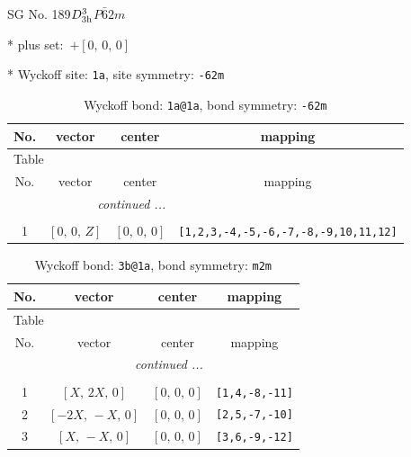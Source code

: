 \documentclass[fleqn,8pt]{jsarticle}
\begin{document}
\setcounter{MaxMatrixCols}{32}

\renewcommand{\tablename}{Table~}
\renewcommand{\figurename}{Figure~}
\begin{center}
\LARGE
SG No. 189\quad$D_{\rm 3h}^{3}$\quad$P\bar{6}2m$\quad[ hexagonal ]
\end{center}

* plus set:\,\,\,$+\left[ 0,\, 0,\, 0 \right]$


* Wyckoff site: {\tt 1a}, site symmetry: {\tt -62m}
\renewcommand{\arraystretch}{1.2}
\begin{longtable}{cccc}
\caption{Wyckoff bond: {\tt 1a@1a}, bond symmetry: {\tt -62m}}
 \\
 \hline \hline
No. & vector & center & mapping \\ \hline \endfirsthead

\multicolumn{3}{l}{\tablename\ \thetable{}} \\
 \hline \hline
No. & vector & center & mapping \\ \hline \endhead

 \hline \hline
\multicolumn{3}{r}{\footnotesize\it continued ...} \\ \endfoot

 \hline \hline
\multicolumn{3}{r}{} \\ \endlastfoot

1 & $\left[ 0,\, 0,\, Z \right]$ & $\left[ 0,\, 0,\, 0 \right]$ & {\tt [1,2,3,-4,-5,-6,-7,-8,-9,10,11,12]} \\
\end{longtable}
\renewcommand{\arraystretch}{1.2}
\begin{longtable}{cccc}
\caption{Wyckoff bond: {\tt 3b@1a}, bond symmetry: {\tt m2m}}
 \\
 \hline \hline
No. & vector & center & mapping \\ \hline \endfirsthead

\multicolumn{3}{l}{\tablename\ \thetable{}} \\
 \hline \hline
No. & vector & center & mapping \\ \hline \endhead

 \hline \hline
\multicolumn{3}{r}{\footnotesize\it continued ...} \\ \endfoot

 \hline \hline
\multicolumn{3}{r}{} \\ \endlastfoot

1 & $\left[ X,\, 2 X,\, 0 \right]$ & $\left[ 0,\, 0,\, 0 \right]$ & {\tt [1,4,-8,-11]} \\ \hline
2 & $\left[ - 2 X,\, - X,\, 0 \right]$ & $\left[ 0,\, 0,\, 0 \right]$ & {\tt [2,5,-7,-10]} \\ \hline
3 & $\left[ X,\, - X,\, 0 \right]$ & $\left[ 0,\, 0,\, 0 \right]$ & {\tt [3,6,-9,-12]} \\
\end{longtable}
\end{document}
